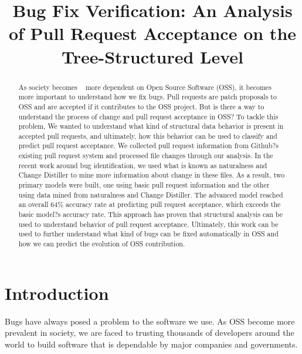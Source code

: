 \documentclass[10pt, conference]{IEEEtran}
\begin{document}
%
\title{Bug Fix Verification: An Analysis of Pull Request Acceptance on the Tree-Structured Level}



\author{
}
\maketitle


\begin{abstract}
As society becomes ~\cite{Yu} more dependent on Open Source Software (OSS), it becomes more important to understand how we fix bugs. Pull requests are patch proposals to OSS and are accepted if it contributes to the OSS project. But is there a way to understand the process of change and pull request acceptance in OSS? To tackle this problem, We wanted to understand what kind of structural data behavior is present in accepted pull requests, and ultimately, how this behavior can be used to classify and predict pull request acceptance. We collected pull request information from Github?s existing pull request system and processed file changes through our analysis. In the recent work around bug identification, we used what is known as naturalness and Change Distiller to mine more information about change in these files. As a result, two primary models were built, one using basic pull request information and the other using data mined from naturalness and Change Distiller. The advanced model reached an overall 64\% accuracy rate at predicting pull request acceptance, which exceeds the basic model?s accuracy rate. This approach has proven that structural analysis can be used to understand behavior of pull request acceptance. Ultimately, this work can be used to further understand what kind of bugs can be fixed automatically in OSS and how we can predict the evolution of OSS contribution.
\end{abstract}
\IEEEpeerreviewmaketitle

\section{Introduction}
Bugs have always posed a problem to the software we use. As OSS become more prevalent in society, we are faced to trusting thousands of developers around the world to build software that is dependable by major companies and governments. 
\end{document}
